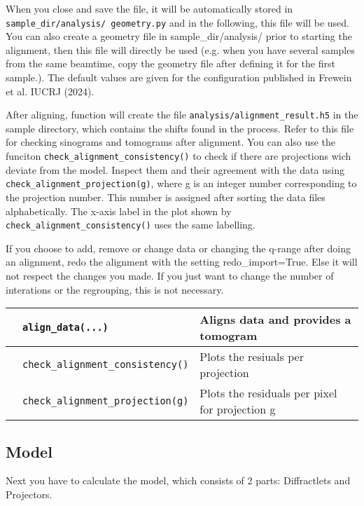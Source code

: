 When you close and save the file, it will be automatically stored in \texttt{sample\_dir/analysis/ geometry.py} and in the following,
this file will be used. You can also create a geometry file in sample\_dir/analysis/ prior to starting the alignment,
then this file will directly be used (e.g. when you have several samples from the same beamtime, copy the geometry file after
defining it for the first sample.). The default values are given for the configuration published in Frewein et al. IUCRJ (2024).

After aligning, function will create the file \texttt{analysis/alignment\_result.h5} in the sample directory, which contains the shifts found
in the process. Refer to this file for checking sinograms and tomograms after alignment.
You can also use the funciton \texttt{check\_alignment\_consistency()} to check if there are projections wich deviate from the
model. Inspect them and their agreement with the data using \texttt{check\_alignment\_projection(g)}, where g is an integer number
corresponding to the projection number. This number is assigned after sorting the data files alphabetically.
The x-axis label in the plot shown by \texttt{check\_alignment\_consistency()} uses the same labelling.

If you choose to add, remove or change data or changing the q-range after doing an alignment, redo the alignment with the
setting redo\_import=True.
Else it will not respect the changes you made. If you just want to change the number of interations or the regrouping,
this is not necessary.

\begin{table}[h!]
    \centering
    \begin{tabular}{| l | l | l |} 
        \hline
         & \texttt{align\_data(...)} & Aligns data and provides a tomogram\\
        \hline
         & \texttt{check\_alignment\_consistency()} & Plots the resiuals per projection\\
         & \texttt{check\_alignment\_projection(g)} & Plots the residuals per pixel for projection g\\
      \hline
     \end{tabular}
\end{table}

\subsection{Model}
Next you have to calculate the model, which consists of 2 parts: Diffractlets and Projectors.


